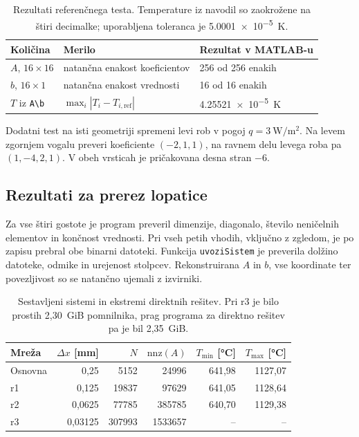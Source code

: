 \documentclass[a4paper,11pt]{article}
\begin{document}
\begin{table}[ht]
\centering
\begin{tabular}{@{}lll@{}}
\toprule
Količina & Merilo & Rezultat v MATLAB-u \\ \midrule
\(A\), \(16\times16\) & natančna enakost koeficientov & 256 od 256 enakih\\
\(b\), \(16\times1\) & natančna enakost vrednosti & 16 od 16 enakih\\
\(T\) iz \verb|A\b| & \(\max_i|T_i-T_{i,\mathrm{ref}}|\) & \SI{4.25521e-5}{\kelvin}\\
\bottomrule
\end{tabular}
\caption{Rezultati referenčnega testa. Temperature iz navodil so zaokrožene na štiri decimalke; uporabljena toleranca je \SI{5.0001e-5}{\kelvin}.}
\label{tab:test}
\end{table}

Dodatni test na isti geometriji spremeni levi rob v pogoj \(q=\SI{3}{\watt\per\square\metre}\). Na levem zgornjem vogalu preveri koeficiente \((-2,1,1)\), na ravnem delu levega roba pa \((1,-4,2,1)\). V obeh vrsticah je pričakovana desna stran \(-6\).

\subsection{Rezultati za prerez lopatice}
Za vse štiri gostote je program preveril dimenzije, diagonalo, število neničelnih elementov in končnost vrednosti. Pri vseh petih vhodih, vključno z zgledom, je po zapisu prebral obe binarni datoteki. Funkcija \texttt{uvoziSistem} je preverila dolžino datoteke, odmike in urejenost stolpcev. Rekonstruirana \(A\) in \(b\), vse koordinate ter povezljivost so se natančno ujemali z izvirniki.

\begin{table}[ht]
\centering
\begin{tabular}{@{}lrrrrr@{}}
\toprule
Mreža & \(\Delta x\) [mm] & \(N\) & \(\mathrm{nnz}(A)\) &
 \(T_{\min}\) [\si{\degreeCelsius}] & \(T_{\max}\) [\si{\degreeCelsius}]\\ \midrule
Osnovna & 0,25 & \num{5152} & \num{24996} & 641,98 & 1127,07\\
r1 & 0,125 & \num{19837} & \num{97629} & 641,05 & 1128,64\\
r2 & 0,0625 & \num{77785} & \num{385785} & 640,70 & 1129,38\\
r3 & 0,03125 & \num{307993} & \num{1533657} & -- & --\\
\bottomrule
\end{tabular}
\caption{Sestavljeni sistemi in ekstremi direktnih rešitev. Pri r3 je bilo prostih 2,30~GiB pomnilnika, prag programa za direktno rešitev pa je bil 2,35~GiB.}
\end{table}
\end{document}

